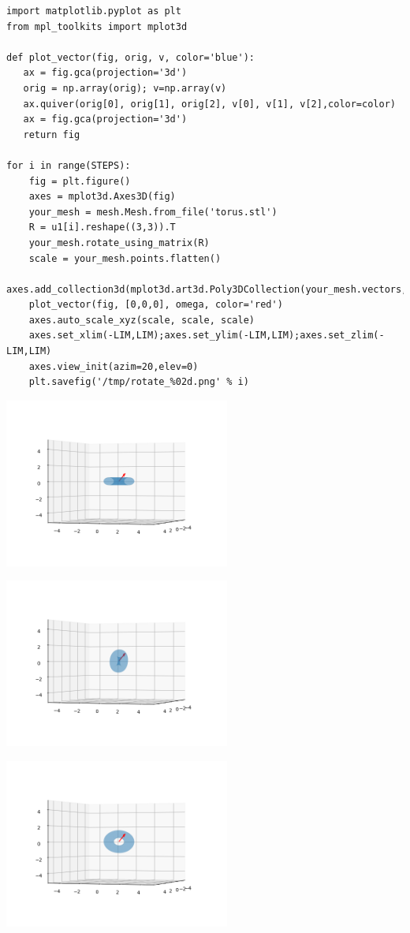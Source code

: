 \documentclass[12pt,fleqn]{article}\usepackage{../../common}
\begin{document}
\begin{verbatim}
import matplotlib.pyplot as plt
from mpl_toolkits import mplot3d

def plot_vector(fig, orig, v, color='blue'):
   ax = fig.gca(projection='3d')
   orig = np.array(orig); v=np.array(v)
   ax.quiver(orig[0], orig[1], orig[2], v[0], v[1], v[2],color=color)
   ax = fig.gca(projection='3d')  
   return fig

for i in range(STEPS):
    fig = plt.figure()
    axes = mplot3d.Axes3D(fig)
    your_mesh = mesh.Mesh.from_file('torus.stl')
    R = u1[i].reshape((3,3)).T
    your_mesh.rotate_using_matrix(R)
    scale = your_mesh.points.flatten()
    axes.add_collection3d(mplot3d.art3d.Poly3DCollection(your_mesh.vectors,alpha=0.3))
    plot_vector(fig, [0,0,0], omega, color='red')
    axes.auto_scale_xyz(scale, scale, scale)
    axes.set_xlim(-LIM,LIM);axes.set_ylim(-LIM,LIM);axes.set_zlim(-LIM,LIM)
    axes.view_init(azim=20,elev=0)
    plt.savefig('/tmp/rotate_%02d.png' % i)  
\end{verbatim}

\includegraphics[width=20em]{sim1/rotate_00.png}

\includegraphics[width=20em]{sim1/rotate_08.png}

\includegraphics[width=20em]{sim1/rotate_14.png}
\end{document}
